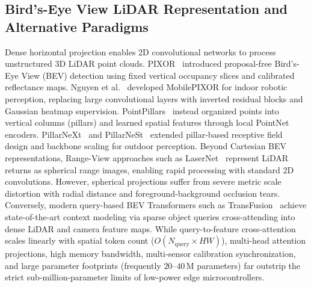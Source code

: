 \subsection{Bird's-Eye View LiDAR Representation and Alternative Paradigms}
\label{sec:rel_bev_encoding}

Dense horizontal projection enables 2D convolutional networks to process unstructured 3D LiDAR point clouds. PIXOR~\cite{yang2018pixor} introduced proposal-free Bird's-Eye View (BEV) detection using fixed vertical occupancy slices and calibrated reflectance maps. Nguyen et al.~\cite{nguyen2024indoor} developed MobilePIXOR for indoor robotic perception, replacing large convolutional layers with inverted residual blocks and Gaussian heatmap supervision. PointPillars~\cite{lang2019pointpillars} instead organized points into vertical columns (pillars) and learned spatial features through local PointNet encoders. PillarNeXt~\cite{li2023pillarnext} and PillarNeSt~\cite{mao2023pillarnest} extended pillar-based receptive field design and backbone scaling for outdoor perception. Beyond Cartesian BEV representations, Range-View approaches such as LaserNet~\cite{meyer2019lasernet} represent LiDAR returns as spherical range images, enabling rapid processing with standard 2D convolutions. However, spherical projections suffer from severe metric scale distortion with radial distance and foreground-background occlusion tears. Conversely, modern query-based BEV Transformers such as TransFusion~\cite{bai2022transfusion} achieve state-of-the-art context modeling via sparse object queries cross-attending into dense LiDAR and camera feature maps. While query-to-feature cross-attention scales linearly with spatial token count ($O(N_{\mathrm{query}} \times HW)$), multi-head attention projections, high memory bandwidth, multi-sensor calibration synchronization, and large parameter footprints (frequently $20\text{--}40\,\text{M}$ parameters) far outstrip the strict sub-million-parameter limits of low-power edge microcontrollers.

